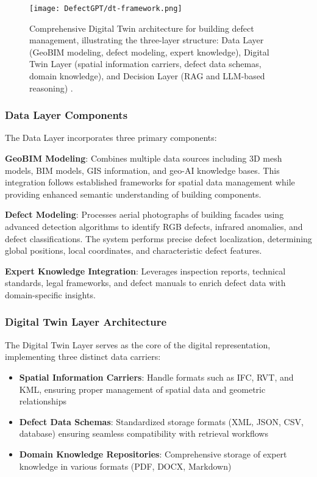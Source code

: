 \begin{figure}[htbp]
    \centering
    \texttt{[image: DefectGPT/dt-framework.png]}
    \caption{Comprehensive Digital Twin architecture for building defect management, illustrating the three-layer structure: Data Layer (GeoBIM modeling, defect modeling, expert knowledge), Digital Twin Layer (spatial information carriers, defect data schemas, domain knowledge), and Decision Layer (RAG and LLM-based reasoning) \cite{zhang2024automated}.}
    \label{fig:dt-architecture}
\end{figure}

\subsubsection{Data Layer Components}

The Data Layer incorporates three primary components:

\textbf{GeoBIM Modeling}: Combines multiple data sources including 3D mesh models, BIM models, GIS information, and geo-AI knowledge bases. This integration follows established frameworks for spatial data management while providing enhanced semantic understanding of building components.

\textbf{Defect Modeling}: Processes aerial photographs of building facades using advanced detection algorithms to identify RGB defects, infrared anomalies, and defect classifications. The system performs precise defect localization, determining global positions, local coordinates, and characteristic defect features.

\textbf{Expert Knowledge Integration}: Leverages inspection reports, technical standards, legal frameworks, and defect manuals to enrich defect data with domain-specific insights.

\subsubsection{Digital Twin Layer Architecture}

The Digital Twin Layer serves as the core of the digital representation, implementing three distinct data carriers:

\begin{itemize}
    \item \textbf{Spatial Information Carriers}: Handle formats such as IFC, RVT, and KML, ensuring proper management of spatial data and geometric relationships
    \item \textbf{Defect Data Schemas}: Standardized storage formats (XML, JSON, CSV, database) ensuring seamless compatibility with retrieval workflows
    \item \textbf{Domain Knowledge Repositories}: Comprehensive storage of expert knowledge in various formats (PDF, DOCX, Markdown)
\end{itemize}

